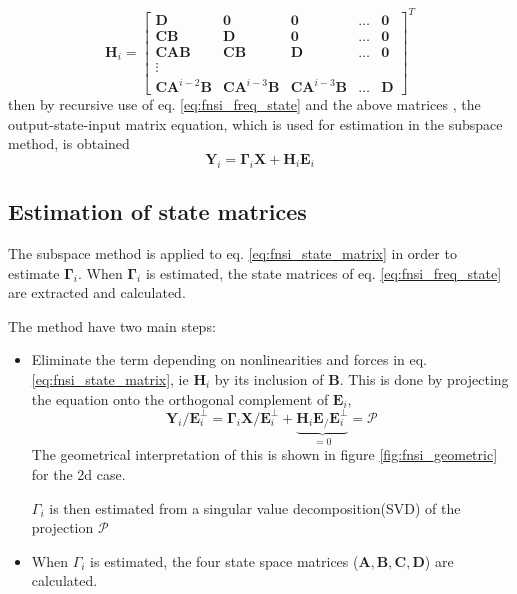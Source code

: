 \begin{equation}
  \bm H_i =
  \begin{bmatrix}
    \bm D                   & \bm 0                   & \bm 0                   & \dots & \bm 0 \\
    \bm C \bm B             & \bm D                   & \bm 0                   & \dots & \bm 0 \\
    \bm C \bm A \bm B       & \bm C \bm B             & \bm D                   & \dots & \bm 0 \\
    \vdots \\
    \bm C \bm A^{i-2} \bm B & \bm C \bm A^{i-3} \bm B & \bm C \bm A^{i-3} \bm B & \dots & \bm D
  \end{bmatrix}^T
\end{equation}
then by recursive use of eq. \eqref{eq:fnsi_freq_state} and the above matrices
\autocite{noel2013a}, the output-state-input matrix equation, which is used for
estimation in the subspace method, is obtained
\begin{equation}
  \label{eq:fnsi_state_matrix}
  \bm Y_i = \bm \Gamma_i \bm X + \bm H_i \bm E_i
\end{equation}


\subsection{Estimation of state matrices}

The subspace method is applied to eq. \eqref{eq:fnsi_state_matrix} in order to
estimate $\bm \Gamma_i$. When $\bm \Gamma_i$ is estimated, the state matrices of
eq. \eqref{eq:fnsi_freq_state} are extracted and calculated.

The method have two main steps:
\begin{itemize}
\item Eliminate the term depending on nonlinearities and forces in eq.
  \eqref{eq:fnsi_state_matrix}, ie $\bm H_i$ by its inclusion of $\bm B$. This
  is done by projecting the equation onto the orthogonal complement of $\bm
  E_i$,
  \begin{equation}
    \bm Y_i / \bm E_i^\perp = \bm \Gamma_i \bm X / \bm E_i^\perp +
    \underbrace{\bm H_i \bm E_ / \bm E_i^\perp}_{=0}
    = \mathcal{P}
  \end{equation}
  The geometrical interpretation of this is shown in figure
  \ref{fig:fnsi_geometric} for the 2d case.

  $\Gamma_i$ is then estimated from a singular value decomposition(SVD) of the
  projection $\mathcal{P}$
\item When $\Gamma_i$ is estimated, the four state space matrices ($\bm A, \bm
  B, \bm C, \bm D$) are calculated.
\end{itemize}

